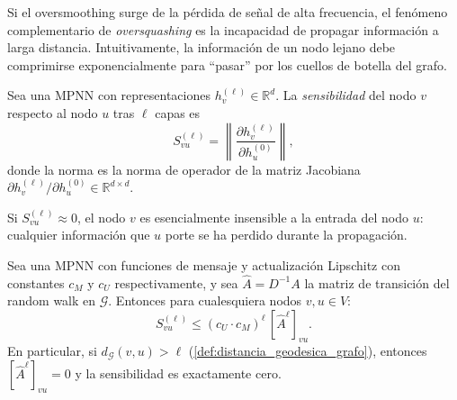 Si el \gls{oversmoothing} surge de la pérdida de señal de alta frecuencia, el fenómeno complementario de \textit{\gls{oversquashing}} es la incapacidad de propagar información a larga distancia. Intuitivamente, la información de un nodo lejano debe comprimirse exponencialmente para ``pasar'' por los cuellos de botella del grafo.

\begin{definition}\label{def:sensibilidad_mpnn}
	Sea una \gls{MPNN} con representaciones $h_v^{(\ell)} \in \mathbb{R}^d$. La \textit{sensibilidad} del nodo $v$ respecto al nodo $u$ tras $\ell$ capas es
	\[
		S_{vu}^{(\ell)} = \left\|\frac{\partial h_v^{(\ell)}}{\partial h_u^{(0)}}\right\|,
	\]
	donde la norma es la norma de operador de la matriz Jacobiana $\partial h_v^{(\ell)} / \partial h_u^{(0)} \in \mathbb{R}^{d \times d}$.
\end{definition}

Si $S_{vu}^{(\ell)} \approx 0$, el nodo $v$ es esencialmente insensible a la entrada del nodo $u$: cualquier información que $u$ porte se ha perdido durante la propagación.

\begin{proposition}\label{prop:oversquashing_exponencial}
	Sea una \gls{MPNN} con funciones de mensaje y actualización Lipschitz con constantes $c_M$ y $c_U$ respectivamente, y sea $\hat{A} = D^{-1}A$ la matriz de transición del random walk en $\mathcal{G}$. Entonces para cualesquiera nodos $v, u \in V$:
	\begin{equation}\label{eq:oversquashing_bound}
		S_{vu}^{(\ell)} \leq (c_U \cdot c_M)^\ell\, [\hat{A}^\ell]_{vu}.
	\end{equation}
	En particular, si $d_\mathcal{G}(v, u) > \ell$ (\autoref{def:distancia_geodesica_grafo}), entonces $[\hat{A}^\ell]_{vu} = 0$ y la sensibilidad es exactamente cero.
\end{proposition}

